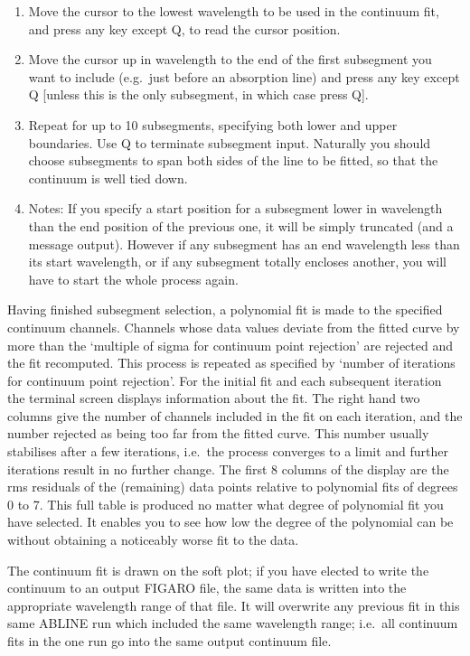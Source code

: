 \begin{enumerate}
\item Move the cursor to the lowest wavelength to be used in the
   continuum fit, and press any key except Q, to read the cursor
   position.
\item Move the cursor up in wavelength to the end of the first
   subsegment you want to include (e.g.\ just before an absorption line)
   and press any key except Q [unless this is the only subsegment, in
   which case press Q].
\item Repeat for up to 10 subsegments, specifying both lower and upper
   boundaries. Use Q to terminate subsegment input.  Naturally you
   should choose subsegments to span both sides of the line to be
   fitted, so that the continuum is well tied down.
\item Notes: If you specify a start position for a subsegment lower in
   wavelength than the end position of the previous one, it will be
   simply truncated (and a message output). However if any subsegment
   has an end wavelength less than its start wavelength, or if any
   subsegment totally encloses another, you will have to start the whole
   process again.
\end{enumerate}

Having finished subsegment selection, a polynomial fit is made to the 
specified continuum channels. Channels whose data values deviate from the 
fitted curve by more than the `multiple of sigma for continuum point 
rejection' are rejected and the fit recomputed. This process is repeated as 
specified by `number of iterations for continuum point rejection'. For the 
initial fit and each subsequent iteration the terminal screen displays 
information about the fit. The right hand two columns give the number of 
channels included in the fit on each iteration, and the number rejected as 
being too far from the fitted curve. This number usually stabilises after a 
few iterations, i.e.\ the process converges to a limit and further 
iterations result in no further change. The first 8 columns of the display 
are the rms residuals of the (remaining) data points relative to 
polynomial fits of degrees 0 to 7. This full table is produced no matter what 
degree of polynomial fit you have selected. It enables you to see how low 
the degree of the polynomial can be without obtaining a noticeably worse 
fit to the data.

The continuum fit is drawn on the soft plot; if you have elected to write 
the continuum to an output FIGARO file, the same data is written into the 
appropriate wavelength range of that file. It will overwrite any previous 
fit in this same ABLINE run which included the same wavelength range; i.e.\ 
all continuum fits in the one run go into the same output continuum file.

